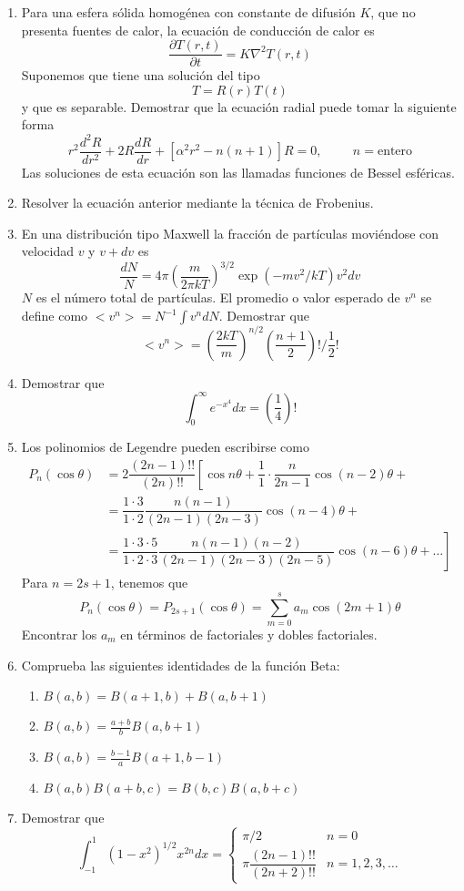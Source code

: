 \begin{enumerate}
\item Para una esfera sólida homogénea con constante de difusión $K$, que no presenta fuentes de calor, la ecuación de conducción de calor es
\[ \dfrac{\partial T(r,t)}{\partial t} = K \nabla^{2} T(r,t) \]
Suponemos que tiene una solución del tipo
\[ T = R(r) T(t) \]
y que es separable. Demostrar que la ecuación radial puede tomar la siguiente forma
\[ r^{2} \dfrac{d^{2} R}{d r^{2}} + 2 R \dfrac{d R}{d r} + [\alpha^{2} r^{2} - n(n+1) ] R = 0, \hspace{1cm} n=\text{entero} \]
Las soluciones de esta ecuación son las llamadas funciones de Bessel esféricas.
\item Resolver la ecuación anterior mediante la técnica de Frobenius.
\item En una distribución tipo Maxwell la fracción de partículas moviéndose con velocidad $v$ y $v+dv$ es
\[ \dfrac{dN}{N} = 4 \pi \left( \dfrac{m}{2 \pi k T} \right)^{3/2} \exp(-mv^{2}/ k T) v^{2} dv \]
$N$ es el número total de partículas. El promedio o valor esperado de $v^{n}$ se define como $<v^{n}> = N^{-1} \int v^{n} dN$. Demostrar que
\[ < v^{n} > = \left( \dfrac{2 k T}{m} \right)^{n/2} \left( \dfrac{n+1}{2} \right) ! \Bigg/ \dfrac{1}{2} ! \]
\item Demostrar que
\[ \int_{0}^{\infty} e^{-x^{4}} dx = \left( \dfrac{1}{4} \right) !\]
\item Los polinomios de Legendre pueden escribirse como
\[ \begin{split}
P_{n}(\cos \theta) &= 2 \dfrac{(2n-1)!!}{(2n)!!} \left[ \cos n\theta + \dfrac{1}{1} \cdot \dfrac{n}{2n-1} \cos(n-2) \theta + \right. \\
&= \dfrac{1 \cdot 3}{1 \cdot 2} \dfrac{n(n-1)}{(2n-1)(2n-3)} \cos(n-4) \theta + \\
&= \left. \dfrac{1 \cdot 3 \cdot 5}{1 \cdot 2 \cdot 3} \dfrac{n(n-1)(n-2)}{(2n-1)(2n-3)(2n-5)} \cos(n-6) \theta + \ldots \right]
\end{split}
\]
Para $n=2s+1$, tenemos que
\[ P_{n}(\cos \theta) =  P_{2s+1} (\cos \theta) =  \sum_{m=0}^{s} a_{m} \cos(2m+1) \theta \]
Encontrar los $a_{m}$ en términos de factoriales y dobles factoriales.
\item Comprueba las siguientes identidades de la función Beta:
\begin{enumerate}
\item $B(a,b) = B(a+1,b) + B(a,b+1)$
\item $B(a,b) = \frac{a+b}{b} B(a,b+1)$ 
\item $B(a,b) = \frac{b-1}{a} B(a+1,b-1)$
\item $B(a,b) B(a+b,c) = B(b,c) B(a,b+c)$
\end{enumerate}
\item Demostrar que
\[ \int_{-1}^{1} (1-x^{2})^{1/2} x^{2n} dx =  
\begin{cases}
\pi/2 & n = 0 \\
\pi \dfrac{(2n-1)!!}{(2n+2)!!} & n=1,2,3,\ldots  \end{cases}
 \]

\end{enumerate}


